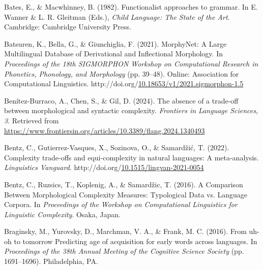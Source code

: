 \documentclass[10pt, letterpaper]{article}
\newlength{\cslhangindent}
\newlength{\cslentryspacingunit} %
\newenvironment{CSLReferences}[2] %
{%
	\setlength{\parindent}{0pt}
	\ifodd #1
	\let\oldpar\par
	\def\par{\hangindent=\cslhangindent\oldpar}
	\fi
}%
{}
\begin{document}
\hypertarget{refs}{}
\begin{CSLReferences}{1}{0}
\leavevmode{}%
Bates, E., \& Macwhinney, B. (1982). Functionalist approaches to
grammar. In E. Wanner \& L. R. Gleitman (Eds.), \emph{Child {Language}:
{The State} of the {Art}}. {Cambridge}: {Cambridge University Press}.

\leavevmode{}%
Batsuren, K., Bella, G., \& Giunchiglia, F. (2021). {MorphyNet}: A
{Large Multilingual Database} of {Derivational} and {Inflectional
Morphology}. In \emph{Proceedings of the 18th {SIGMORPHON Workshop} on
{Computational Research} in {Phonetics}, {Phonology}, and {Morphology}}
(pp. 39--48). {Online}: {Association for Computational Linguistics}.
http://doi.org/\href{https://doi.org/10.18653/v1/2021.sigmorphon-1.5}{10.18653/v1/2021.sigmorphon-1.5}

\leavevmode{}%
Benítez-Burraco, A., Chen, S., \& Gil, D. (2024). The absence of a
trade-off between morphological and syntactic complexity.
\emph{Frontiers in Language Sciences}, \emph{3}. Retrieved from
\url{https://www.frontiersin.org/articles/10.3389/flang.2024.1340493}

\leavevmode{}%
Bentz, C., Gutierrez-Vasques, X., Sozinova, O., \& Samardžić, T. (2022).
Complexity trade-offs and equi-complexity in natural languages: A
meta-analysis. \emph{Linguistics Vanguard}.
http://doi.org/\href{https://doi.org/10.1515/lingvan-2021-0054}{10.1515/lingvan-2021-0054}

\leavevmode{}%
Bentz, C., Ruzsics, T., Koplenig, A., \& Samardžic, T. (2016). A
{Comparison Between Morphological Complexity Measures}: {Typological
Data} vs. {Language Corpora}. In \emph{Proceedings of the {Workshop} on
{Computational Linguistics} for {Linguistic Complexity}}. {Osaka,
Japan}.

\leavevmode{}%
Braginsky, M., Yurovsky, D., Marchman, V. A., \& Frank, M. C. (2016).
From uh-oh to tomorrow {Predicting} age of acquisition for early words
across languages. In \emph{Proceedings of the 38th {Annual Meeting} of
the {Cognitive Science Society}} (pp. 1691--1696). {Philadelphia, PA}.


\end{CSLReferences}
\end{document}
